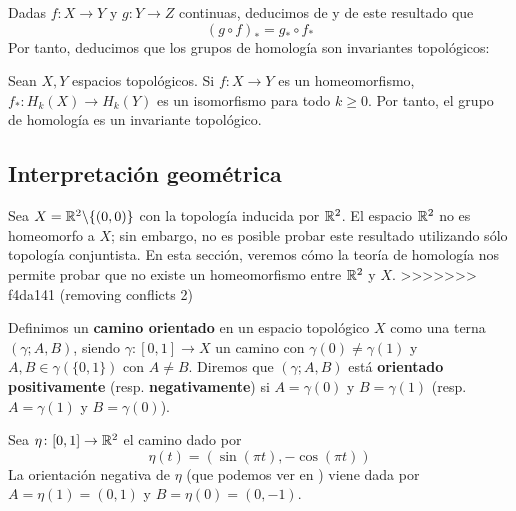 \begin{proposition}
Dadas $f\colon X \to Y$ y
$g\colon Y \to Z$ continuas, deducimos de  y de este resultado que
	\[(g\circ f)_*=g_*\circ f_*\]
Por tanto, deducimos que los grupos de homología son invariantes topológicos:

\begin{theorem}
	Sean $X,Y$ espacios topológicos.
	Si $f\colon X \to Y$ es un homeomorfismo, $f_*\colon H_k(X) \to H_k(Y)$ es un isomorfismo para todo $k \geq 0$.
	Por tanto, el grupo de homología es un invariante topológico.
\end{theorem}

\subsection{Interpretación geométrica}
Sea $X=\mathbb{R}^2\backslash\{(0,0)\}$ con la topología inducida por $\mathbb{R}^2$. El
espacio $\mathbb{R}^2$ no es homeomorfo a $X$; sin embargo, no es posible probar
este resultado utilizando sólo topología conjuntista. En esta sección, veremos
cómo la teoría de homología nos permite probar que no existe un homeomorfismo
entre $\mathbb{R}^2$ y $X$.
>>>>>>> f4da141 (removing conflicts 2)

Definimos un \textbf{camino orientado} en un espacio topológico $X$ como una terna $(\gamma; A,B)$, siendo $\gamma\colon [0,1] \to X$ un camino con $\gamma(0)\neq \gamma(1)$ y $A,B \in \gamma(\{0,1\})$ con $A\neq B$.
Diremos que $(\gamma; A,B)$ está \textbf{orientado positivamente} (resp. \textbf{negativamente}) si $A=\gamma(0)$ y $B=\gamma(1)$ (resp. $A=\gamma(1)$ y $B=\gamma(0)$).

\begin{example}
Sea $\eta\colon [0,1] \to \mathbb{R}^2$ el camino dado por
	\[\eta(t)=(\sin(\pi t),-\cos(\pi t))\]
La orientación negativa de $\eta$ (que podemos ver en ) viene dada por $A=\eta(1)=(0,1)$ y $B=\eta(0)=(0,-1)$.
\end{example}



\end{proposition}

